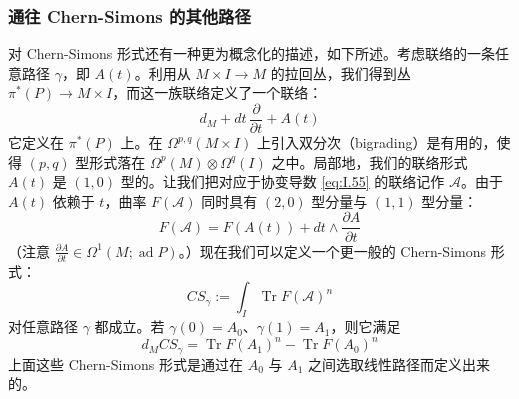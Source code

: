 
\subsubsection{通往 Chern-Simons 的其他路径} %

对 Chern-Simons 形式还有一种更为概念化的描述，如下所述。考虑联络的一条任意路径 $\gamma$，即 $A(t)$。利用从 $M\times I\to M$ 的拉回丛，我们得到丛 $\pi^*(P)\to M\times I$，而这一族联络定义了一个联络：
\begin{equation}
d_M+dt\,\frac{\partial}{\partial t}+A(t)
\tag{I.55}
\label{eq:I.55}
\end{equation}
它定义在 $\pi^*(P)$ 上。在 $\Omega^{p,q}(M\times I)$ 上引入双分次（bigrading）是有用的，使得 $(p,q)$ 型形式落在 $\Omega^p(M)\otimes\Omega^q(I)$ 之中。局部地，我们的联络形式 $A(t)$ 是 $(1,0)$ 型的。让我们把对应于协变导数 \eqref{eq:I.55} 的联络记作 $\mathcal{A}$。由于 $A(t)$ 依赖于 $t$，曲率 $F(\mathcal{A})$ 同时具有 $(2,0)$ 型分量与 $(1,1)$ 型分量：
\begin{equation}
F(\mathcal{A})=F(A(t))+dt\wedge\frac{\partial A}{\partial t}
\tag{I.56}
\label{eq:I.56}
\end{equation}
（注意 $\frac{\partial A}{\partial t}\in\Omega^1(M;\operatorname{ad}P)$。）现在我们可以定义一个更一般的 Chern-Simons 形式：
\begin{equation}
CS_\gamma:=\int_I\operatorname{Tr}F(\mathcal{A})^n
\tag{I.57}
\label{eq:I.57}
\end{equation}
对任意路径 $\gamma$ 都成立。若 $\gamma(0)=A_0$、$\gamma(1)=A_1$，则它满足
\begin{equation}
d_M CS_\gamma=\operatorname{Tr}F(A_1)^n-\operatorname{Tr}F(A_0)^n
\tag{I.58}
\label{eq:I.58}
\end{equation}
上面这些 Chern-Simons 形式是通过在 $A_0$ 与 $A_1$ 之间选取线性路径而定义出来的。


